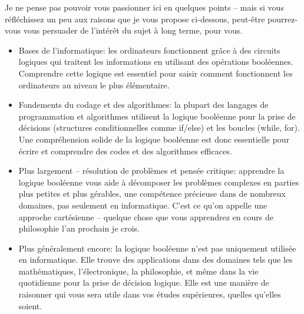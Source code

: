 \documentclass[12pt]{article}
\begin{document}
	Je ne pense pas pouvoir vous passionner ici en quelques points -- mais si vous réfléchissez un peu aux raisons que je vous propose ci-dessous, peut-être pourrez-vous vous persuader de l'intérêt du sujet à long terme, pour vous.
	\begin{itemize}
		\item Bases de l'informatique: les ordinateurs fonctionnent grâce à des circuits logiques qui traitent les informations en utilisant des opérations booléennes. Comprendre cette logique est essentiel pour saisir comment fonctionnent les ordinateurs au niveau le plus élémentaire.
		\item Fondements du codage et des algorithmes: la plupart des langages de programmation et algorithmes utilisent la logique booléenne pour la prise de décisions (structures conditionnelles comme if/else) et les boucles (while, for). Une compréhension solide de la logique booléenne est donc essentielle pour écrire et comprendre des codes et des algorithmes efficaces.
		\item Plus largement -- résolution de problèmes et pensée critique: apprendre la logique booléenne vous aide à décomposer les problèmes complexes en parties plus petites et plus gérables, une compétence précieuse dans de nombreux domaines, pas seulement en informatique. C'est ce qu'on appelle une approche cartésienne -- quelque chose que vous apprendrez en cours de philosophie l'an prochain je crois.
		\item Plus généralement encore: la logique booléenne n'est pas uniquement utilisée en informatique. Elle trouve des applications dans des domaines tels que les mathématiques, l'électronique, la philosophie, et même dans la vie quotidienne pour la prise de décision logique. Elle est une manière de raisonner qui vous sera utile dans vos études supérieures, quelles qu'elles soient.
	\end{itemize}
	
\end{document}
